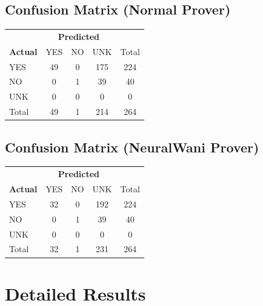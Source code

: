 \documentclass[a4paper,10pt]{article}
\begin{document}
\subsection{Confusion Matrix (Normal Prover)}

\begin{tabular}{l|ccc|c}
\toprule
 & \multicolumn{3}{c|}{\textbf{Predicted}} & \\
\textbf{Actual} & YES & NO & UNK & Total \\
\midrule
YES & 49 & 0 & 175 & 224 \\
NO & 0 & 1 & 39 & 40 \\
UNK & 0 & 0 & 0 & 0 \\
\midrule
Total & 49 & 1 & 214 & 264 \\
\bottomrule
\end{tabular}


\subsection{Confusion Matrix (NeuralWani Prover)}

\begin{tabular}{l|ccc|c}
\toprule
 & \multicolumn{3}{c|}{\textbf{Predicted}} & \\
\textbf{Actual} & YES & NO & UNK & Total \\
\midrule
YES & 32 & 0 & 192 & 224 \\
NO & 0 & 1 & 39 & 40 \\
UNK & 0 & 0 & 0 & 0 \\
\midrule
Total & 32 & 1 & 231 & 264 \\
\bottomrule
\end{tabular}



\section{Detailed Results}
\end{document}
